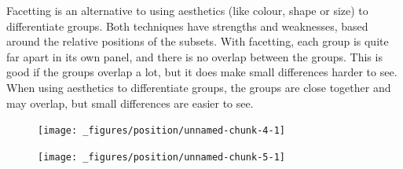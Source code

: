 Facetting is an alternative to using aesthetics (like colour, shape or
size) to differentiate groups. Both techniques have strengths and
weaknesses, based around the relative positions of the subsets.
  With
facetting, each group is quite far apart in its own panel, and there is
no overlap between the groups. This is good if the groups overlap a lot,
but it does make small differences harder to see. When using aesthetics
to differentiate groups, the groups are close together and may overlap,
but small differences are easier to see.

\begin{Shaded}
\begin{Highlighting}[]
\StringTok{ }\NormalTok{(}
   \NormalTok{(}\NormalTok{, }\NormalTok{(}\NormalTok{, }\NormalTok{, }\NormalTok{)),}
   \NormalTok{(}\NormalTok{, }\NormalTok{(}\NormalTok{, }\NormalTok{, }\NormalTok{)),}
  \NormalTok{ letters[}\OperatorTok{:}\NormalTok{]}
\NormalTok{)}

\OperatorTok{+}\StringTok{ }
\StringTok{  }\NormalTok{(}\NormalTok{(}
\end{Highlighting}
\end{Shaded}

\begin{figure}[H]
  \centering
  \texttt{[image: \_figures/position/unnamed-chunk-4-1]}
\end{figure}

\begin{Shaded}
\begin{Highlighting}[]
\OperatorTok{+}\StringTok{ }
\StringTok{  }\NormalTok{() }\OperatorTok{+}\StringTok{ }
\StringTok{  }\NormalTok{(}\OperatorTok{~}
\end{Highlighting}
\end{Shaded}

\begin{figure}[H]
  \texttt{[image: \_figures/position/unnamed-chunk-5-1]}
\end{figure}

